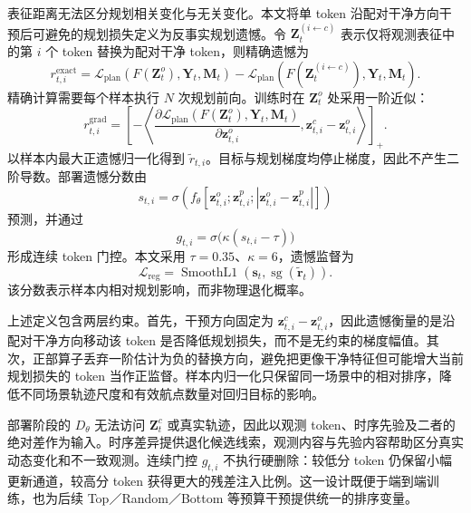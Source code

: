 \documentclass[letterpaper,10pt,conference]{ieeeconf}
\newcommand{\sg}{\operatorname{sg}}
\begin{document}
表征距离无法区分规划相关变化与无关变化。本文将单 token 沿配对干净方向干预后可避免的规划损失定义为反事实规划遗憾。令 $\mathbf Z_t^{(i\leftarrow c)}$ 表示仅将观测表征中的第 $i$ 个 token 替换为配对干净 token，则精确遗憾为
\begin{equation}
r_{t,i}^{\mathrm{exact}}=
\mathcal L_{\mathrm{plan}}(F(\mathbf Z_t^o),\mathbf Y_t,\mathbf M_t)
-\mathcal L_{\mathrm{plan}}(F(\mathbf Z_t^{(i\leftarrow c)}),\mathbf Y_t,\mathbf M_t).
\label{eq:exact_regret}
\end{equation}
精确计算需要每个样本执行 $N$ 次规划前向。训练时在 $\mathbf Z_t^o$ 处采用一阶近似：
\begin{equation}
r_{t,i}^{\mathrm{grad}}=
\left[-\left\langle
\frac{\partial\mathcal L_{\mathrm{plan}}(F(\mathbf Z_t^o),\mathbf Y_t,\mathbf M_t)}{\partial\mathbf z_{t,i}^o},
\mathbf z_{t,i}^c-\mathbf z_{t,i}^o
\right\rangle\right]_+ .
\label{eq:gradient_regret}
\end{equation}
以样本内最大正遗憾归一化得到 $\tilde r_{t,i}$。目标与规划梯度均停止梯度，因此不产生二阶导数。部署遗憾分数由
\begin{equation}
s_{t,i}=\sigma\!\left(f_\theta[\mathbf z_{t,i}^o;
\mathbf z_{t,i}^p;|\mathbf z_{t,i}^o-\mathbf z_{t,i}^p|]\right)
\label{eq:regret_score}
\end{equation}
预测，并通过
\begin{equation}
g_{t,i}=\sigma\bigl(\kappa(s_{t,i}-\tau)\bigr)
\label{eq:gate}
\end{equation}
形成连续 token 门控。本文采用 $\tau=0.35$、$\kappa=6$，遗憾监督为
\begin{equation}
\mathcal L_{\mathrm{reg}}=
\operatorname{SmoothL1}(\mathbf s_t,\sg(\tilde{\mathbf r}_t)).
\label{eq:regret_loss}
\end{equation}
该分数表示样本内相对规划影响，而非物理退化概率。

上述定义包含两层约束。首先，干预方向固定为 $\mathbf z_{t,i}^c-\mathbf z_{t,i}^o$，因此遗憾衡量的是沿配对干净方向移动该 token 是否降低规划损失，而不是无约束的梯度幅值。其次，正部算子丢弃一阶估计为负的替换方向，避免把更像干净特征但可能增大当前规划损失的 token 当作正监督。样本内归一化只保留同一场景中的相对排序，降低不同场景轨迹尺度和有效航点数量对回归目标的影响。

部署阶段的 $D_\theta$ 无法访问 $\mathbf Z_t^c$ 或真实轨迹，因此以观测 token、时序先验及二者的绝对差作为输入。时序差异提供退化候选线索，观测内容与先验内容帮助区分真实动态变化和不一致观测。连续门控 $g_{t,i}$ 不执行硬删除：较低分 token 仍保留小幅更新通道，较高分 token 获得更大的残差注入比例。这一设计既便于端到端训练，也为后续 Top／Random／Bottom 等预算干预提供统一的排序变量。
\end{document}

